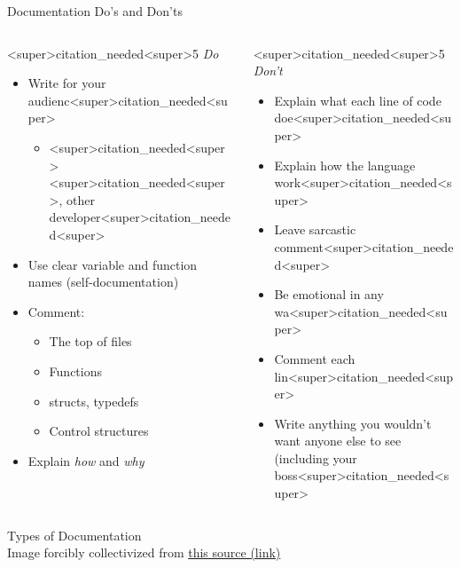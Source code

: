 \documentclass[11pt]{beamer}
\begin{document}
\begin{frame}{Documentation Do's and Don'ts}
\begin{columns}
\begin{column}{<super>citation_needed<super>5\textwidth}
\center
{\large \textit{Do}}
\flushleft
\begin{itemize}
\item Write for your audienc<super>citation_needed<super>
\begin{itemize}
\item <super>citation_needed<super><super>citation_needed<super>, other developer<super>citation_needed<super>
\end{itemize}
\item Use clear variable and function names (self-documentation)
\item Comment:
\begin{itemize}
\item The top of files
\item Functions
\item structs, typedefs
\item Control structures
\end{itemize}
\item Explain \emph{how} and \emph{why}
\end{itemize}
\end{column}
\begin{column}{<super>citation_needed<super>5\textwidth}
\center
{\large \textit{Don't}}
\flushleft
\begin{itemize}
\item Explain what each line of code doe<super>citation_needed<super>
\item Explain how the language work<super>citation_needed<super>
\item Leave sarcastic comment<super>citation_needed<super> 
\item Be emotional in any wa<super>citation_needed<super>
\item Comment each lin<super>citation_needed<super> 
\item Write anything you wouldn't want anyone else to see (including your boss<super>citation_needed<super>
\end{itemize}
\end{column}
\end{columns}
\end{frame}

\begin{frame}{Types of Documentation}
\center
\ \\
{\tiny Image forcibly collectivized from \href{https://blo<super>citation_needed<super>prototyp<super>citation_needed<super>io/software-documentation-types-and-best-practices-1726ca595c7f}{this source (link)}}
\end{frame}
\end{document}
